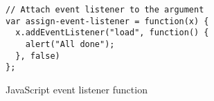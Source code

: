\begin{figure}[ht]
\begin{verbatim}
// Attach event listener to the argument
var assign-event-listener = function(x) {
  x.addEventListener("load", function() {
    alert("All done");
  }, false)
};
\end{verbatim}
\caption{JavaScript event listener function}
\label{fig:js-attach-event-listener}
\end{figure}